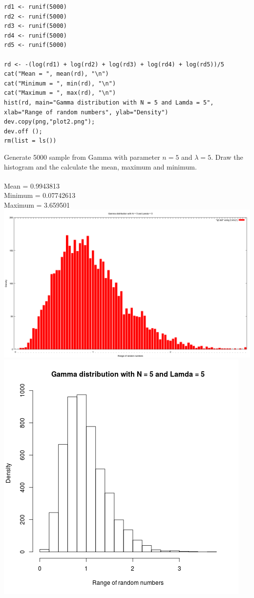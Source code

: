 \documentclass{article}
\begin{document}
\begin{lstlisting}
rd1 <- runif(5000)
rd2 <- runif(5000)
rd3 <- runif(5000)
rd4 <- runif(5000)
rd5 <- runif(5000)

rd <- -(log(rd1) + log(rd2) + log(rd3) + log(rd4) + log(rd5))/5
cat("Mean = ", mean(rd), "\n")
cat("Minimum = ", min(rd), "\n")
cat("Maximum = ", max(rd), "\n")
hist(rd, main="Gamma distribution with N = 5 and Lamda = 5", xlab="Range of random numbers", ylab="Density")
dev.copy(png,"plot2.png");
dev.off ();
rm(list = ls())
\end{lstlisting}
Generate 5000 sample from Gamma with parameter $n = 5$ and
$ \lambda  = 5$. Draw the histogram and the calculate the mean, maximum and minimum.\\\\
Mean =  0.9943813 \\
Minimum =  0.07742613 \\
Maximum =  3.659501 \\
\includegraphics[scale=0.3]{"q2"}
\includegraphics{"plot2"}
\pagebreak
\end{document}
